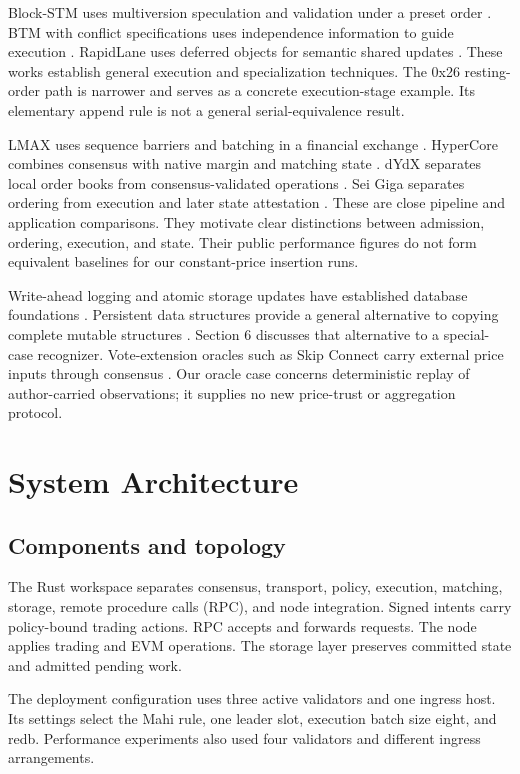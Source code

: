 \documentclass[11pt]{article}
\begin{document}
Block-STM uses multiversion speculation and validation under a preset order \cite{R08}. BTM with conflict specifications uses independence information to guide execution \cite{R24}. RapidLane uses deferred objects for semantic shared updates \cite{R25}. These works establish general execution and specialization techniques. The 0x26 resting-order path is narrower and serves as a concrete execution-stage example. Its elementary append rule is not a general serial-equivalence result.

LMAX uses sequence barriers and batching in a financial exchange \cite{R26}. HyperCore combines consensus with native margin and matching state \cite{R17}. dYdX separates local order books from consensus-validated operations \cite{R18}. Sei Giga separates ordering from execution and later state attestation \cite{R19}. These are close pipeline and application comparisons. They motivate clear distinctions between admission, ordering, execution, and state. Their public performance figures do not form equivalent baselines for our constant-price insertion runs.

Write-ahead logging and atomic storage updates have established database foundations \cite{R10}. Persistent data structures provide a general alternative to copying complete mutable structures \cite{R28}. Section 6 discusses that alternative to a special-case recognizer. Vote-extension oracles such as Skip Connect carry external price inputs through consensus \cite{R23}. Our oracle case concerns deterministic replay of author-carried observations; it supplies no new price-trust or aggregation protocol.

\section{System Architecture}
\subsection{Components and topology}
The Rust workspace separates consensus, transport, policy, execution, matching, storage, remote procedure calls (RPC), and node integration. Signed intents carry policy-bound trading actions. RPC accepts and forwards requests. The node applies trading and EVM operations. The storage layer preserves committed state and admitted pending work. \cite{R12}

The deployment configuration uses three active validators and one ingress host. Its settings select the Mahi rule, one leader slot, execution batch size eight, and redb. Performance experiments also used four validators and different ingress arrangements. \cite{R12,R13}
\end{document}

